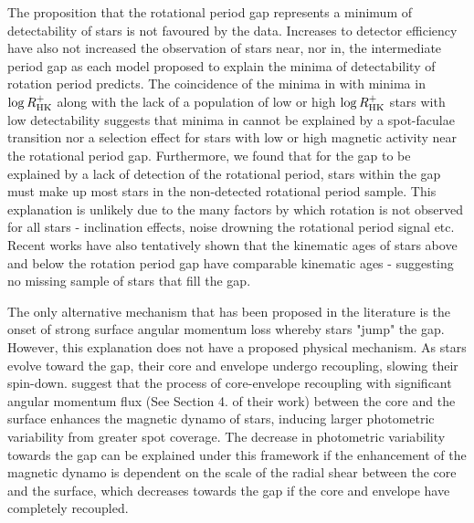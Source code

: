 The proposition that the rotational period gap represents a minimum of detectability of stars is not favoured by the data.
Increases to detector efficiency have also not increased the observation of stars near, nor in, the intermediate period gap as each model proposed to explain the minima of detectability of rotation period predicts.
The coincidence of the minima in \rper{} with minima in $\log R^{+}_{\rm{HK}}$ along with the lack of a population of low or high $\log R^{+}_{\rm{HK}}$ stars with low detectability suggests that minima in \rper{} cannot be explained by a spot-faculae transition nor a selection effect for stars with low or high magnetic activity near the rotational period gap.
Furthermore, we found that for the gap to be explained by a lack of detection of the rotational period, stars within the gap must make up most stars in the \kepler{} non-detected rotational period sample.
This explanation is unlikely due to the many factors by which rotation is not observed for all stars - inclination effects, noise drowning the rotational period signal etc.
Recent works have also tentatively shown that the kinematic ages of stars above and below the rotation period gap have comparable kinematic ages \citep{lu_bridging_2022} - suggesting no missing sample of stars that fill the gap.

The only alternative mechanism that has been proposed in the literature is the onset of strong surface angular momentum loss whereby stars "jump" the gap.
However, this explanation does not have a proposed physical mechanism.
As stars evolve toward the gap, their core and envelope undergo recoupling, slowing their spin-down.
\citet{cao_core-envelope_2023} suggest that the process of core-envelope recoupling with significant angular momentum flux (See Section 4. of their work) between the core and the surface enhances the magnetic dynamo of stars, inducing larger photometric variability from greater spot coverage.
The decrease in photometric variability towards the gap can be explained under this framework if the enhancement of the magnetic dynamo is dependent on the scale of the radial shear between the core and the surface, which decreases towards the gap if the core and envelope have completely recoupled.

